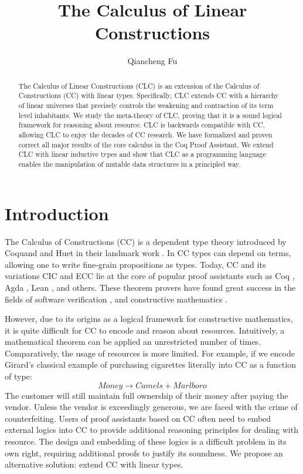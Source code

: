 \documentclass{article}
\title{The Calculus of Linear Constructions}
\author{Qiancheng Fu}
\theoremstyle{definition}
\begin{document}
  \maketitle 
  \begin{abstract}
    The Calculus of Linear Constructions (CLC) is an extension of the Calculus of Constructions (CC) with linear types. Specifically, CLC extends CC with a hierarchy of linear universes that precisely controls the weakening and contraction of its term level inhabitants. We study the meta-theory of CLC, proving that it is a sound logical framework for reasoning about resource. CLC is backwards compatible with CC, allowing CLC to enjoy the decades of CC research. We have formalized and proven correct all major results of the core calculus in the Coq Proof Assistant. We extend CLC with linear inductive types and show that CLC as a programming language enables the manipulation of mutable data structures in a principled way.
  \end{abstract}

  \section{Introduction}
  The Calculus of Constructions (CC) is a dependent type theory introduced by Coquand and Huet in their landmark work \cite{cc}. In CC types can depend on terms, allowing one to write fine-grain propositions as types. Today, CC and its variations CIC \cite{cic} and ECC \cite{ecc} lie at the core of popular proof assistants such as Coq \cite{coq}, Agda \cite{agda}, Lean \cite{lean}, and others. These theorem provers have found great success in the fields of software verification \cite{compcert,deepspec}, and constructive mathematics \cite{four-color,schemes}. 
  
  However, due to its origins as a logical framework for constructive mathematics, it is quite difficult for CC to encode and reason about resources. Intuitively, a mathematical theorem can be applied an unrestricted number of times. Comparatively, the usage of resources is more limited. For example, if we encode Girard's classical example \cite{girard95} of purchasing cigarettes literally into CC as a function of type:
  \begin{equation*}
    Money \rightarrow Camels + Marlboro
  \end{equation*}
  The customer will still maintain full ownership of their money after paying the vendor. Unless the vendor is exceedingly generous, we are faced with the crime of counterfeiting. Users of proof assistants based on CC often need to embed external logics into CC \cite{bedrock} to provide additional reasoning principles for dealing with resource. The design and embedding of these logics is a difficult problem in its own right, requiring additional proofs to justify its soundness. We propose an alternative solution: extend CC with linear types.
\end{document}

